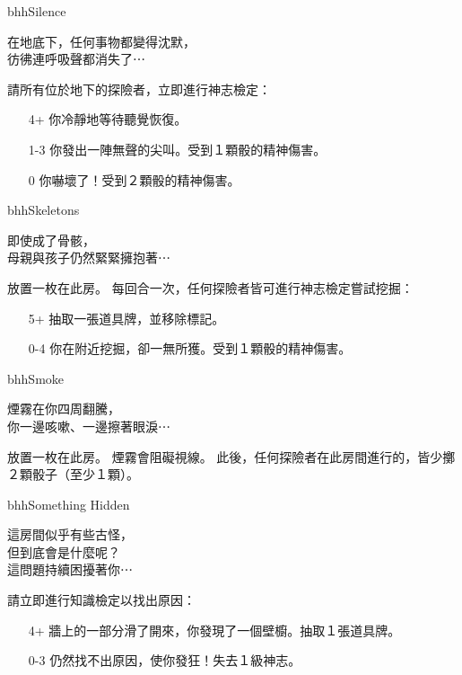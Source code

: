 \linebreak[0]%
\begin{EventCard}{bhh}{Silence}
  \begin{CardStory}
    在地底下，任何事物都變得沈默，\\
    彷彿連呼吸聲都消失了⋯
  \end{CardStory}
  請所有位於地下的探險者，立即進行神志檢定：
  \begin{itemize}
    \item[4+] 你冷靜地等待聽覺恢復。
    \item[1-3] 你發出一陣無聲的尖叫。受到１顆骰的精神傷害。
    \item[0] 你嚇壞了！受到２顆骰的精神傷害。
  \end{itemize}
\end{EventCard}%
\linebreak[0]%
\begin{EventCard}{bhh}{Skeletons}
  \begin{CardStory}
    即使成了骨骸，\\
    母親與孩子仍然緊緊擁抱著⋯
  \end{CardStory}
  放置一枚在此房。\smallbreak
  每回合一次，任何探險者皆可進行神志檢定嘗試挖掘：
  \begin{itemize}
    \item[5+] 抽取一張道具牌，並移除標記。
    \item[0-4] 你在附近挖掘，卻一無所獲。受到１顆骰的精神傷害。
  \end{itemize}
\end{EventCard}%
\linebreak[0]%
\begin{EventCard}{bhh}{Smoke}
  \begin{CardStory}
    煙霧在你四周翻騰，\\
    你一邊咳嗽、一邊擦著眼淚⋯
  \end{CardStory}
  放置一枚在此房。\smallbreak
  煙霧會阻礙視線。\smallbreak
  此後，任何探險者在此房間進行的，皆少擲２顆骰子（至少１顆）。\smallbreak
\end{EventCard}%
\linebreak[0]%
\begin{EventCard}{bhh}{Something Hidden}
  \begin{CardStory}
    這房間似乎有些古怪，\\
    但到底會是什麼呢？\\
    這問題持續困擾著你⋯
  \end{CardStory}
  請立即進行知識檢定以找出原因：
  \begin{itemize}
    \item[4+] 牆上的一部分滑了開來，你發現了一個壁櫥。抽取１張道具牌。
    \item[0-3] 仍然找不出原因，使你發狂！失去１級神志。
  \end{itemize}
\end{EventCard}%
